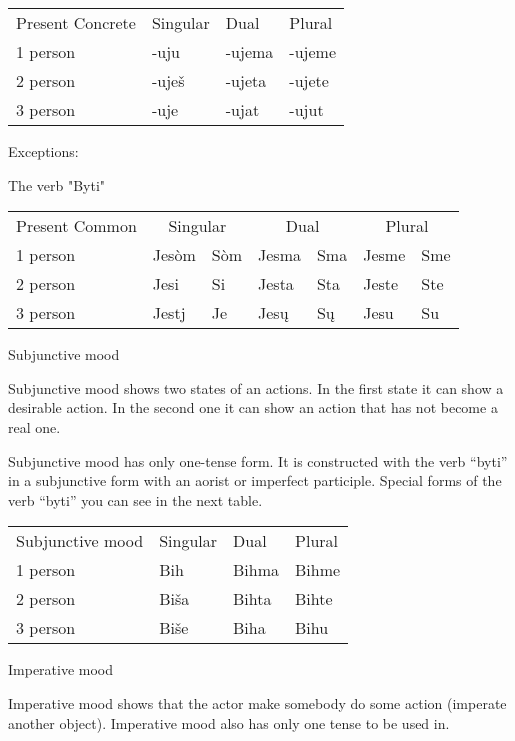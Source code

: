 \begin{table}
	\begin{tabular}{llll}
		Present Concrete & Singular & Dual & Plural \\
		1 person & -uju & -ujema & -ujeme \\
		2 person & -uješ & -ujeta & -ujete \\
		3 person & -uje & -ujat & -ujut
	\end{tabular}
\end{table}


Exceptions:

The verb "Byti"

\begin{table}
	\begin{tabular}{lllllll}
		Present Common
			& \multicolumn{2}{c}{Singular}
			 & \multicolumn{2}{c}{Dual}
			 & \multicolumn{2}{c}{Plural} \\
		1 person & Jesòm & Sòm & Jesma & Sma & Jesme & Sme \\
		2 person & Jesi & Si & Jesta & Sta & Jeste & Ste \\
		3 person & Jestj & Je & Jesų & Sų & Jesu & Su
	\end{tabular}
\end{table}


Subjunctive mood

Subjunctive mood shows two states of an actions. In the first state it can show a desirable action. In the second one it can show an action that has not become a real one. 

Subjunctive mood has only one-tense form. It is constructed with the verb “byti” in a subjunctive form with an aorist or imperfect participle. Special forms of the verb “byti” you can see in the next table.

\begin{table}
	\begin{tabular}{llll}
		Subjunctive mood & Singular & Dual & Plural \\
		1 person & Bih & Bihma & Bihme \\
		2 person & Biša & Bihta & Bihte \\
		3 person & Biše & Biha & Bihu
	\end{tabular}
\end{table}

Imperative mood

Imperative mood shows that the actor make somebody do some action (imperate another object). Imperative mood also has only one tense to be used in. 


